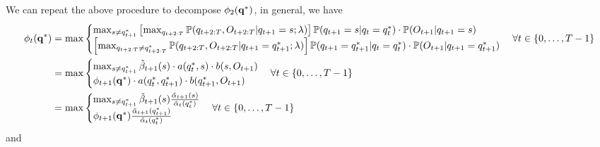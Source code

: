 We can repeat the above procedure to decompose $\phi_2(\mathbf{q}^*)$, in general, we have
\begin{equation*}
\begin{aligned}
\phi_t(\mathbf{q}^*) 
&= \max \begin{cases}
          \max_{s \ne q_{t+1}^*} \left[ \max_{q_{t+2:T}} \mathbb{P}(q_{t+2:T}, O_{t+2:T} |q_{t+1} = s; \lambda) \right] \mathbb{P}(q_{t+1} = s |q_t = q_t^*) \cdot 
               \mathbb{P}(O_{t+1} |q_{t+1} = s) \\
          \left[ \max_{q_{t+2:T} \ne q_{t+2:T}^*} \mathbb{P}(q_{t+2:T}, O_{t+2:T} |q_{t+1} = q_{t+1}^*; \lambda) \right]
               \mathbb{P}(q_{t+1} = q_{t+1}^* |q_t = q_t^*) \cdot \mathbb{P}(O_{t+1} |q_{t+1} = q_{t+1}^*)
        \end{cases}  \forall t \in \{0,\dots,T-1\} \\
&= \max \begin{cases}
          \max_{s \ne q_{t+1}^*} \tilde{\beta}_{t+1}(s) \cdot a(q_t^*, s) \cdot b(s, O_{t+1}) \\
          \phi_{t+1}(\mathbf{q}^*) \cdot a(q_t^*, q_{t+1}^*) \cdot b(q_{t+1}^*, O_{t+1})
        \end{cases}  \forall t \in \{0,\dots,T-1\} \\
&= \max \begin{cases}
          \max_{s \ne q_{t+1}^*} \tilde{\beta}_{t+1}(s) \frac{\tilde{\alpha}_{t+1}(s)}         {\tilde{\alpha}_t(q_t^*)} \\
          \phi_{t+1}(\mathbf{q}^*)                       \frac{\tilde{\alpha}_{t+1}(q_{t+1}^*)} {\tilde{\alpha}_t(q_t^*)}
        \end{cases}  \forall t \in \{0,\dots,T-1\} \\
\end{aligned}
\end{equation*}
and 
